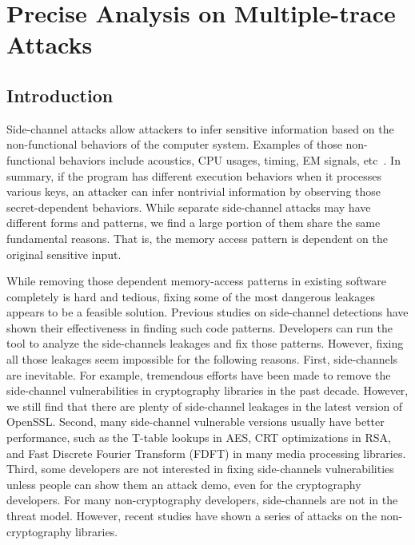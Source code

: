 
\chapter{Precise Analysis on Multiple-trace Attacks}\label{chapter5}
\section{Introduction}
Side-channel attacks allow attackers to infer sensitive information based on the non-functional behaviors of the computer system. Examples of those non-functional behaviors include acoustics, CPU usages, timing, EM signals, etc~\cite{agrawal2002side,hund2013practical,halevi2015keyboard,batina2019csi}. In summary, if the program has different execution behaviors when it processes various keys, an attacker can infer nontrivial information by observing those secret-dependent behaviors. While separate side-channel attacks may have different forms and patterns, we find a large portion of them share the same fundamental reasons. That is, the memory access pattern is dependent on the original sensitive input.

While removing those dependent memory-access patterns in existing software completely is hard and tedious, fixing some of the most dangerous leakages appears to be a feasible solution. Previous studies on side-channel detections have shown their effectiveness in finding such code patterns. Developers can run the tool to analyze the side-channels leakages and fix those patterns. However, fixing all those leakages seem impossible for the following reasons. First, side-channels are inevitable. For example, tremendous efforts have been made to remove the side-channel vulnerabilities in cryptography libraries in the past decade. However, we still find that there are plenty of side-channel leakages in the latest version of OpenSSL. Second, many side-channel vulnerable versions usually have better performance, such as the T-table lookups in AES, CRT optimizations in RSA, and Fast Discrete Fourier Transform (FDFT) in many media processing libraries. Third, some developers are not interested in fixing side-channels vulnerabilities unless people can show them an attack demo, even for the cryptography developers. For many non-cryptography developers, side-channels are not in the threat model. However, recent studies have shown a series of attacks on the non-cryptography libraries.

